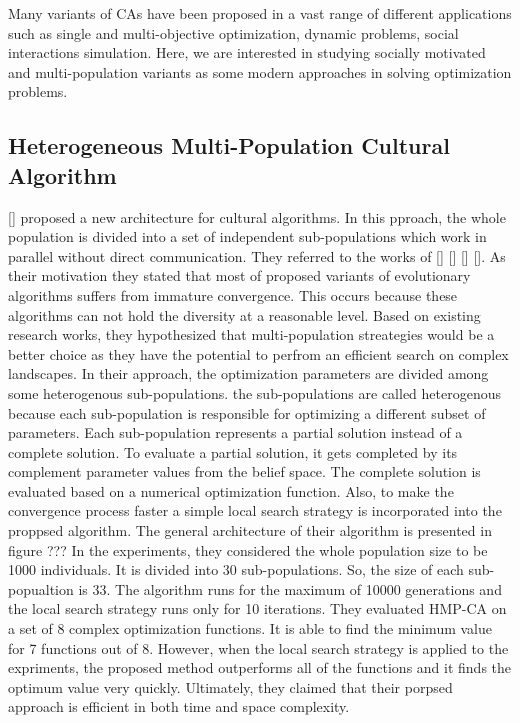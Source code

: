 \label{chapter:problem}

\newlength{\savedunitlength}
\setlength{\unitlength}{2em}

Many variants of CAs have been proposed in a vast range of different applications such as single and multi-objective optimization, dynamic problems, social interactions simulation. Here, we are interested in studying socially motivated and multi-population variants as some modern approaches in solving optimization problems.
\subsection{Heterogeneous Multi-Population Cultural Algorithm}
[] proposed a new architecture for cultural algorithms. In this pproach, the whole population is divided into a set of independent sub-populations which work in parallel without direct communication. They referred to the works of [] [] [] []. As their motivation they stated that most of proposed variants of evolutionary algorithms suffers from immature convergence. This occurs because these algorithms can not hold the diversity at a reasonable level. Based on existing research works, they hypothesized that multi-population streategies would be a better choice as they have the potential to perfrom an efficient search on complex landscapes. In their approach, the optimization parameters are divided among some heterogenous sub-populations. the sub-populations are called heterogenous because each sub-population is responsible for optimizing a different subset of parameters. Each sub-population represents a partial solution instead of a complete solution. To evaluate a partial solution, it gets completed by its complement parameter values from the belief space. The complete solution is evaluated based on a numerical optimization function. Also, to make the convergence process faster a simple local search strategy is incorporated into the proppsed algorithm. The general architecture of their algorithm is presented in figure ???\newline
In the experiments, they considered the whole population size to be 1000 individuals. It is divided into 30 sub-populations. So, the size of each sub-popualtion is 33. The algorithm runs for the maximum of 10000 generations and the local search strategy runs only for 10 iterations. They evaluated HMP-CA on a set of 8 complex optimization functions. It is able to find the minimum value for 7 functions out of 8. However, when the local search strategy is applied to the expriments, the proposed method outperforms all of the functions and it finds the optimum value very quickly. Ultimately, they claimed that their porpsed approach is efficient in both time and space complexity.

